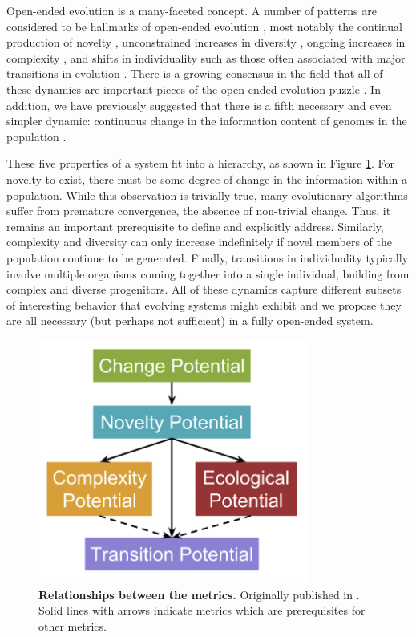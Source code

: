 \documentclass[letterpaper]{article}
\begin{document}
Open-ended evolution is a many-faceted concept. A number of patterns are considered to be hallmarks of open-ended evolution \citep{taylor_open-ended_2016}, most notably the continual production of novelty \citep{lehman_abandoning_2011, banzhaf_defining_2016}, unconstrained increases in diversity \citep{bedau1994bifurcation}, ongoing increases in complexity \citep{Lenski:2003vy, Korb:2011kg}, and shifts in individuality such as those often associated with major transitions in evolution \citep{smith1997major}. There is a growing consensus in the field that all of these dynamics are important pieces of the open-ended evolution puzzle \citep{taylor_open-ended_2016}. In addition, we have previously suggested that there is a fifth necessary and even simpler dynamic: continuous change in the
information content of genomes in the
population \citep{blogpost}.

These five properties of a system fit into a hierarchy, as shown in Figure \ref{hierarchy}. For novelty to exist, there must be some degree of change in the information within a population. While this observation is trivially true, many evolutionary algorithms suffer from premature convergence, the absence of non-trivial change. Thus, it remains an important prerequisite to define and explicitly address. Similarly, complexity and diversity can only increase indefinitely if novel members of the population continue to be generated. Finally, transitions in individuality typically involve multiple organisms coming together into a single individual, building from complex and diverse progenitors.  All of these dynamics capture different subsets of interesting behavior that evolving systems might exhibit and we propose they are all necessary (but perhaps not sufficient) in a fully open-ended system.

\begin{figure}
\includegraphics[width=3.5in]{figs/Complexity_Barriers.png}
\caption{\textbf{Relationships between the metrics.} Originally published in \citep{blogpost}. Solid lines with arrows indicate metrics which are prerequisites for other metrics.}
\label{hierarchy}
\end{figure}
\end{document}
